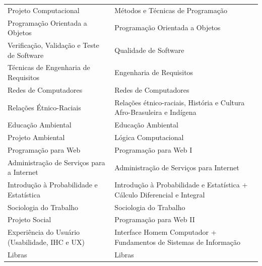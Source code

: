\documentclass[11pt,fleqn]{book} %
\begin{document}
\begin{table}[]
{\begin{tabular}{@{}l|l@{}}
			Projeto Computacional                                         & Métodos e Técnicas de Programação                                         \\
			Programação Orientada a Objetos                               & Programação Orientada a Objetos                                           \\
			Verificação, Validação e Teste de Software                    & Qualidade de Software                                                     \\
			Técnicas de Engenharia de Requisitos                          & Engenharia de Requisitos                                                  \\
			Redes de Computadores                                         & Redes de Computadores                                                     \\
			Relações Étnico-Raciais                                       & Relações étnico-raciais, História e Cultura Afro-Brasuleira e Indígena    \\
			Educação Ambiental                                            & Educação Ambiental                                                        \\
			Projeto Ambiental                                             & Lógica Computacional                                                      \\
			Programação para Web                                          & Programação para Web I                                                    \\
			Administração de Serviços para a Internet                     & Administração de Serviços para Internet                                   \\
			Introdução à Probabilidade e Estatística                      & Introdução à Probabilidade e Estatística + Cálculo Diferencial e Integral \\
			Sociologia do Trabalho                                        & Sociologia do Trabalho                                                    \\
			Projeto Social                                                & Programação para Web II                                                   \\
			Experiência do Usuário (Usabilidade, IHC e UX)                & Interface Homem Computador + Fundamentos de Sistemas de Informação        \\
			Libras                                                        & Libras                                                                    \\

\end{tabular}}
\end{table}
\end{document}
